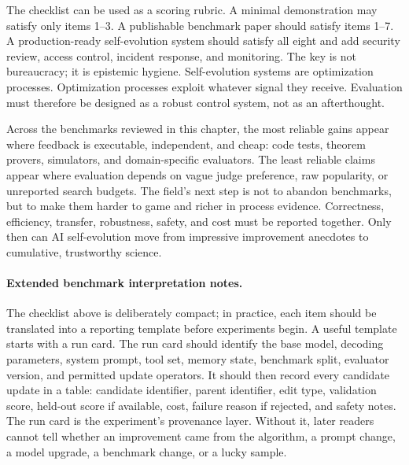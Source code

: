 The checklist can be used as a scoring rubric. A minimal demonstration may satisfy only items 1--3. A publishable benchmark paper should satisfy items 1--7. A production-ready self-evolution system should satisfy all eight and add security review, access control, incident response, and monitoring. The key is not bureaucracy; it is epistemic hygiene. Self-evolution systems are optimization processes. Optimization processes exploit whatever signal they receive. Evaluation must therefore be designed as a robust control system, not as an afterthought.

Across the benchmarks reviewed in this chapter, the most reliable gains appear where feedback is executable, independent, and cheap: code tests, theorem provers, simulators, and domain-specific evaluators. The least reliable claims appear where evaluation depends on vague judge preference, raw popularity, or unreported search budgets. The field's next step is not to abandon benchmarks, but to make them harder to game and richer in process evidence. Correctness, efficiency, transfer, robustness, safety, and cost must be reported together. Only then can AI self-evolution move from impressive improvement anecdotes to cumulative, trustworthy science.

\paragraph{Extended benchmark interpretation notes.}
The checklist above is deliberately compact; in practice, each item should be translated into a reporting template before experiments begin. A useful template starts with a run card. The run card should identify the base model, decoding parameters, system prompt, tool set, memory state, benchmark split, evaluator version, and permitted update operators. It should then record every candidate update in a table: candidate identifier, parent identifier, edit type, validation score, held-out score if available, cost, failure reason if rejected, and safety notes. The run card is the experiment's provenance layer. Without it, later readers cannot tell whether an improvement came from the algorithm, a prompt change, a model upgrade, a benchmark change, or a lucky sample.

